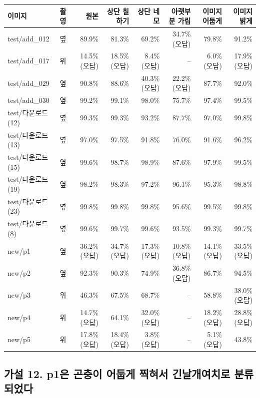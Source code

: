 \documentclass[11pt]{article}
\begin{document}
\begin{center}\footnotesize
\begin{tabular}{llrrrrrr}
\toprule
이미지 & 촬영 & 원본 & 상단 칠하기 & 상단 네모 & 아랫부분 가림 & 이미지 어둡게 & 이미지 밝게 \\
\midrule
test/add\_012 & 옆 & 89.9\% & 81.3\% & 69.2\% & 34.7\% (오답) & 79.8\% & 91.2\% \\
test/add\_017 & 위 & 14.5\% (오답) & 18.5\% (오답) & 8.4\% (오답) & -- & 6.0\% (오답) & 17.9\% (오답) \\
test/add\_029 & 옆 & 90.8\% & 88.6\% & 40.3\% (오답) & 22.2\% (오답) & 87.7\% & 92.0\% \\
test/add\_030 & 옆 & 99.2\% & 99.1\% & 98.0\% & 75.7\% & 97.4\% & 99.5\% \\
test/다운로드 (12) & 옆 & 99.3\% & 99.3\% & 93.2\% & 87.7\% & 97.0\% & 99.8\% \\
test/다운로드 (13) & 옆 & 97.0\% & 97.5\% & 91.8\% & 76.0\% & 91.6\% & 96.2\% \\
test/다운로드 (15) & 옆 & 99.6\% & 98.7\% & 98.9\% & 87.6\% & 97.9\% & 99.5\% \\
test/다운로드 (19) & 옆 & 98.2\% & 98.3\% & 97.2\% & 96.1\% & 95.3\% & 98.8\% \\
test/다운로드 (23) & 옆 & 99.8\% & 99.8\% & 99.8\% & 95.6\% & 99.5\% & 99.8\% \\
test/다운로드 (8) & 옆 & 99.6\% & 99.7\% & 99.6\% & 93.5\% & 99.3\% & 99.7\% \\
new/p1 & 옆 & 36.2\% (오답) & 34.7\% (오답) & 17.3\% (오답) & 10.8\% (오답) & 14.1\% (오답) & 33.5\% (오답) \\
new/p2 & 옆 & 92.3\% & 90.3\% & 74.9\% & 36.8\% (오답) & 86.7\% & 94.5\% \\
new/p3 & 위 & 46.3\% & 67.5\% & 68.7\% & -- & 58.8\% & 38.0\% (오답) \\
new/p4 & 위 & 14.7\% (오답) & 64.1\% & 32.0\% (오답) & -- & 18.2\% (오답) & 28.8\% (오답) \\
new/p5 & 위 & 17.8\% (오답) & 18.4\% (오답) & 3.8\% (오답) & -- & 5.1\% (오답) & 43.8\% \\
\bottomrule
\end{tabular}
\end{center}

\subsection*{가설 12. p1은 곤충이 어둡게 찍혀서 긴날개여치로 분류되었다}
\end{document}
